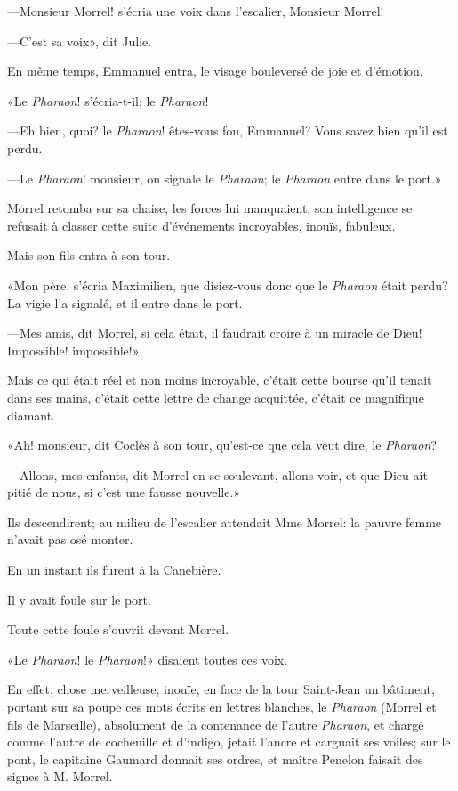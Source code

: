 —Monsieur Morrel! s'écria une voix dans l'escalier, Monsieur Morrel!

—C'est sa voix», dit Julie.

En même temps, Emmanuel entra, le visage bouleversé de joie et d'émotion.

«Le \textit{Pharaon}! s'écria-t-il; le \textit{Pharaon}!

—Eh bien, quoi? le \textit{Pharaon}! êtes-vous fou, Emmanuel? Vous savez bien qu'il est perdu.

—Le \textit{Pharaon}! monsieur, on signale le \textit{Pharaon}; le \textit{Pharaon} entre dans le port.»

Morrel retomba sur sa chaise, les forces lui manquaient, son intelligence se refusait à classer cette suite d'événements incroyables, inouïs, fabuleux.

Mais son fils entra à son tour.

«Mon père, s'écria Maximilien, que disiez-vous donc que le \textit{Pharaon} était perdu? La vigie l'a signalé, et il entre dans le port.

—Mes amis, dit Morrel, si cela était, il faudrait croire à un miracle de Dieu! Impossible! impossible!»

Mais ce qui était réel et non moins incroyable, c'était cette bourse qu'il tenait dans ses mains, c'était cette lettre de change acquittée, c'était ce magnifique diamant.

«Ah! monsieur, dit Coclès à son tour, qu'est-ce que cela veut dire, le \textit{Pharaon}?

—Allons, mes enfants, dit Morrel en se soulevant, allons voir, et que Dieu ait pitié de nous, si c'est une fausse nouvelle.»

Ils descendirent; au milieu de l'escalier attendait Mme Morrel: la pauvre femme n'avait pas osé monter.

En un instant ils furent à la Canebière.

Il y avait foule sur le port.

Toute cette foule s'ouvrit devant Morrel.

«Le \textit{Pharaon}! le \textit{Pharaon}!» disaient toutes ces voix.

En effet, chose merveilleuse, inouïe, en face de la tour Saint-Jean un bâtiment, portant sur sa poupe ces mots écrits en lettres blanches, le \textit{Pharaon} (Morrel et fils de Marseille), absolument de la contenance de l'autre \textit{Pharaon}, et chargé comme l'autre de cochenille et d'indigo, jetait l'ancre et carguait ses voiles; sur le pont, le capitaine Gaumard donnait ses ordres, et maître Penelon faisait des signes à M. Morrel.

